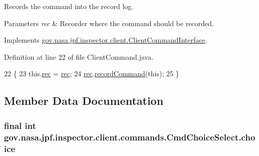 Records the command into the record log. 


\begin{DoxyParams}{Parameters}
{\em rec} & Recorder where the command should be recorded. \\
\hline
\end{DoxyParams}


Implements \hyperlink{interfacegov_1_1nasa_1_1jpf_1_1inspector_1_1client_1_1_client_command_interface_a4ae9ac9bbb61d9a758ef168e8b3b04ff}{gov.\+nasa.\+jpf.\+inspector.\+client.\+Client\+Command\+Interface}.



Definition at line 22 of file Client\+Command.\+java.


\begin{DoxyCode}
22                                                   \{
23     this.\hyperlink{classgov_1_1nasa_1_1jpf_1_1inspector_1_1client_1_1_client_command_af4246f2427035c72a6af45a2c61361f7}{rec} = \hyperlink{classgov_1_1nasa_1_1jpf_1_1inspector_1_1client_1_1_client_command_af4246f2427035c72a6af45a2c61361f7}{rec};
24     \hyperlink{classgov_1_1nasa_1_1jpf_1_1inspector_1_1client_1_1_client_command_af4246f2427035c72a6af45a2c61361f7}{rec}.\hyperlink{classgov_1_1nasa_1_1jpf_1_1inspector_1_1client_1_1_command_recorder_af5f212124179773e46c8b45f1d01a32d}{recordCommand}(\textcolor{keyword}{this});
25   \}
\end{DoxyCode}


\subsection{Member Data Documentation}
\subsubsection[{\texorpdfstring{choice}{choice}}]{\setlength{\rightskip}{0pt plus 5cm}final int gov.\+nasa.\+jpf.\+inspector.\+client.\+commands.\+Cmd\+Choice\+Select.\+choice\hspace{0.3cm}{\ttfamily [private]}}\hypertarget{classgov_1_1nasa_1_1jpf_1_1inspector_1_1client_1_1commands_1_1_cmd_choice_select_ae6fd217c673bc63e67a1b7c54ea78376}{}\label{classgov_1_1nasa_1_1jpf_1_1inspector_1_1client_1_1commands_1_1_cmd_choice_select_ae6fd217c673bc63e67a1b7c54ea78376}


